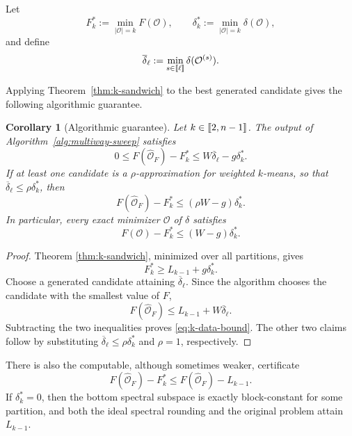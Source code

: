 \documentclass[11pt]{article}
\newtheorem{corollary}[theorem]{Corollary}
\newcommand{\1}{\mathbf{1}}
\providecommand{\llbracket}{\mathopen{[\mkern-2.7mu[}}
\providecommand{\rrbracket}{\mathclose{]\mkern-2.7mu]}}
\begin{document}
Let
\[
    F_k^*:=\min_{|\mathcal O|=k}F(\mathcal O),
    \qquad
    \delta_k^*:=\min_{|\mathcal O|=k}\delta(\mathcal O),
\]
and define
\[
    \overline\delta_\ell
    :=\min_{s\in\llbracket\ell\rrbracket}
      \delta(\mathcal O^{(s)}).
\]

Applying Theorem~\ref{thm:k-sandwich} to the best generated candidate
gives the following algorithmic guarantee.

\begin{corollary}[Algorithmic guarantee]
\label{cor:k-algorithm}
Let $k\in\llbracket 2,n-1\rrbracket$.
The output of Algorithm~\ref{alg:multiway-sweep} satisfies
\begin{equation}
    0\leq F(\widehat{\mathcal O}_F)-F_k^*
    \leq W\overline\delta_\ell-g\delta_k^*.
    \label{eq:k-data-bound}
\end{equation}
If at least one candidate is a $\rho$-approximation for weighted
$k$-means, so that
$\overline\delta_\ell\leq\rho\delta_k^*$, then
\begin{equation*}
    F(\widehat{\mathcal O}_F)-F_k^*
    \leq(\rho W-g)\delta_k^*.
\end{equation*}
In particular, every exact minimizer $\mathcal O$ of $\delta$
satisfies
\begin{equation*}
    F(\mathcal O)-F_k^*
    \leq(W-g)\delta_k^*.
\end{equation*}
\end{corollary}

\begin{proof}
Theorem \ref{thm:k-sandwich}, minimized over all partitions, gives
\[
    F_k^*\geq L_{k-1}+g\delta_k^*.
\]
Choose a generated candidate attaining $\overline\delta_\ell$.
Since the algorithm chooses the candidate with the smallest value of
$F$,
\[
    F(\widehat{\mathcal O}_F)
    \leq L_{k-1}+W\overline\delta_\ell.
\]
Subtracting the two inequalities proves \eqref{eq:k-data-bound}.
The other two claims follow by substituting
$\overline\delta_\ell\leq\rho\delta_k^*$ and $\rho=1$,
respectively.
\end{proof}

There is also the computable, although sometimes weaker, certificate
\begin{equation*}
    F(\widehat{\mathcal O}_F)-F_k^*
    \leq F(\widehat{\mathcal O}_F)-L_{k-1}.
\end{equation*}
If $\delta_k^*=0$, then the bottom spectral subspace is exactly
block-constant for some partition, and both the ideal spectral
rounding and the original problem attain $L_{k-1}$.
\end{document}
